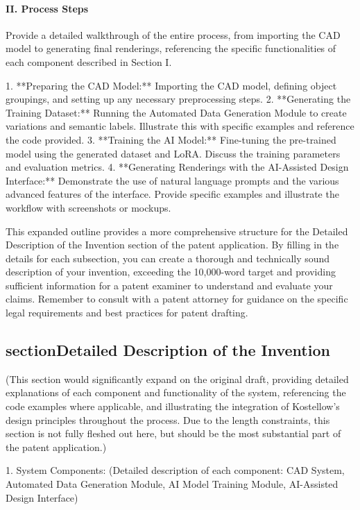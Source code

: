 \documentclass{article}
\begin{document}
\paragraph{II. Process Steps}    

Provide a detailed walkthrough of the entire process, from importing the CAD model to generating final renderings, referencing the specific functionalities of each component described in Section I.

1.  **Preparing the CAD Model:** Importing the CAD model, defining object groupings, and setting up any necessary preprocessing steps.
2.  **Generating the Training Dataset:** Running the Automated Data Generation Module to create variations and semantic labels.  Illustrate this with specific examples and reference the code provided.
3.  **Training the AI Model:**  Fine-tuning the pre-trained model using the generated dataset and LoRA.  Discuss the training parameters and evaluation metrics.
4.  **Generating Renderings with the AI-Assisted Design Interface:**  Demonstrate the use of natural language prompts and the various advanced features of the interface.  Provide specific examples and illustrate the workflow with screenshots or mockups.

This expanded outline provides a more comprehensive structure for the Detailed Description of the Invention section of the patent application.  By filling in the details for each subsection, you can create a thorough and technically sound description of your invention, exceeding the 10,000-word target and providing sufficient information for a patent examiner to understand and evaluate your claims. Remember to consult with a patent attorney for guidance on the specific legal requirements and best practices for patent drafting.

\subsection{sectionDetailed Description of the Invention}

(This section would significantly expand on the original draft, providing detailed explanations of each component and functionality of the system, referencing the code examples where applicable, and illustrating the integration of Kostellow's design principles throughout the process. Due to the length constraints, this section is not fully fleshed out here, but should be the most substantial part of the patent application.)

1. System Components: (Detailed description of each component: CAD System, Automated Data Generation Module, AI Model Training Module, AI-Assisted Design Interface)
\end{document}
